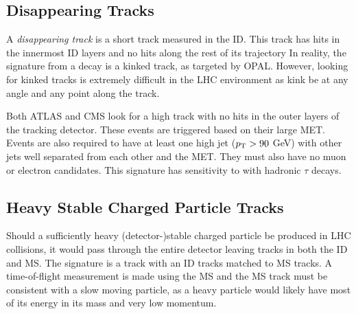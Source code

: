 \subsection{Disappearing Tracks}
\label{sec:dt-limit}

A \emph{disappearing track} is a short track measured in the \acf{ID}. This track has hits in the innermost \ac{ID} layers and no hits along the rest of its trajectory In reality, the signature from a \slep decay is a kinked track, as targeted by OPAL. However, looking for kinked tracks is extremely difficult in the \ac{LHC} environment as kink be at any angle and any point along the track.

Both \ac{ATLAS} and \ac{CMS} look for a high \pt track with no hits in the outer layers of the tracking detector. These events are triggered based on their large \ac{MET}. Events are also required to have at least one high \pt jet ($p_{\text{T}} > 90$ GeV) with other jets well separated from each other and the \ac{MET}. They must also have no muon or electron candidates. This signature has sensitivity to \stau with hadronic $\tau$ decays.


\subsection{Heavy Stable Charged Particle Tracks}
\label{sec:hscp-limit}

Should a sufficiently heavy (detector-)stable charged particle be produced in \ac{LHC} collisions, it would pass through the entire detector leaving tracks in both the \ac{ID} and \ac{MS}. The signature is a track with an \ac{ID} tracks matched to \ac{MS} tracks. A time-of-flight measurement is made using the \ac{MS} and the \ac{MS} track must be consistent with a slow moving particle, as a heavy particle would likely have most of its energy in its mass and very low momentum.
